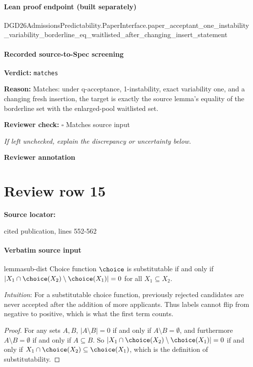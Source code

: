 \documentclass[10pt]{article}
\newcommand{\reviewerbox}{%
  \par\noindent\fbox{\parbox{0.96\linewidth}{\rule{0pt}{0.38in}}}\par
}
\newcommand{\reviewmatch}[1]{%
  \par\noindent\textbf{Reviewer check:} $\square$\; #1\par
  \noindent\emph{If left unchecked, explain the discrepancy or uncertainty below.}\par
}
\begin{document}
\paragraph{Lean proof endpoint (built separately)}\begin{ReviewVerbatim}
DGD26AdmissionsPredictability.PaperInterface.paper_acceptant_one_instability_variability_borderline_eq_waitlisted_after_changing_insert_statement
\end{ReviewVerbatim}

\paragraph{Recorded source-to-Spec screening}
\textbf{Verdict:} \texttt{matches}
\\
{\raggedright
\textbf{Reason:} Matches:\allowbreak{} under q-\allowbreak{}acceptance, 1-\allowbreak{}instability, exact variability one, and a changing fresh insertion, the target is exactly the source lemma's equality of the borderline set with the enlarged-\allowbreak{}pool waitlisted set.\allowbreak{}
\par}
\reviewmatch{Matches source input}
\noindent\textbf{Reviewer annotation}\par
\reviewerbox
\clearpage
\hypertarget{source-claim-ef4d58145103cd0c}{}
\section*{Review row 15}
\textbf{Source locator:} {\footnotesize\raggedright cited publication, lines 552-\allowbreak{}562\par}
\paragraph{Verbatim source input}
\begin{ReviewVerbatim}
\begin{restatable}{lemma}{sub-dist}
\label{lem:substitutability-term}
Choice function $\choice$ is substitutable if and only if $|X_1 \cap \choice(X_2) \setminus \choice(X_1)| = 0$ for all $X_1 \subseteq X_2$.
\end{restatable}

\textit{Intuition}:
For a substitutable choice function, previously rejected candidates are never accepted after the addition of more applicants. Thus labels cannot flip from negative to positive, which is what the first term counts.

\begin{proof}
For any sets $A, B$, $|A \setminus B| = 0$ if and only if $A \setminus B = \emptyset$, and furthermore $A \setminus B = \emptyset$ if and only if $A \subseteq B$. So $|X_1 \cap \choice(X_2) \setminus \choice(X_1)| = 0$ if and only if $X_1 \cap \choice(X_2) \subseteq \choice(X_1)$, which is the definition of substitutability.
\end{proof}
\end{ReviewVerbatim}
\end{document}
